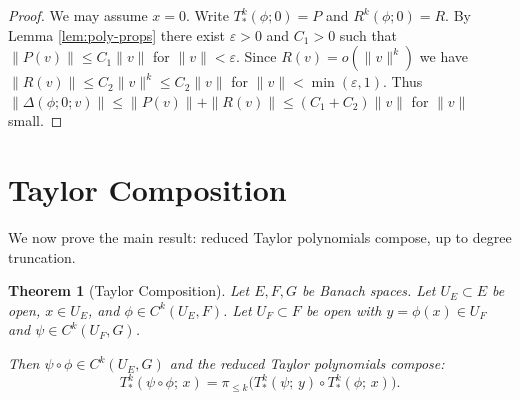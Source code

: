 \documentclass[10pt,a4paper]{article}
\theoremstyle{plain}
\newtheorem{theorem}{Theorem}
\theoremstyle{definition}
\newcommand{\1}{\mathbb{1}} %
\newcommand{\eps}{\varepsilon} %
\begin{document}
\begin{proof}

We may assume \(x = 0\). Write \(T_{\ast}^k(\phi; 0) = P\) and
\(R^k(\phi; 0) = R\). By Lemma \ref{lem:poly-props} there exist
\(\eps > 0\) and \(C_1 > 0\) such that \(\|P(v)\| \leq C_1\|v\|\) for
\(\|v\| < \eps\). Since \(R(v) = o(\|v\|^k)\) we have
\(\|R(v)\| \leq C_2\|v\|^k \leq C_2\|v\|\) for
\(\|v\| < \min(\eps, 1)\). Thus
\(\|\Delta(\phi; 0; v)\| \leq \|P(v)\| + \|R(v)\| \leq (C_1 + C_2)\|v\|\)
for \(\|v\|\) small.

\end{proof}

\section{Taylor Composition}\label{taylor-composition}

We now prove the main result: reduced Taylor polynomials compose, up to
degree truncation.

\begin{theorem}[Taylor Composition]

\label{thm:fdb-comp} Let \(E,F,G\) be Banach spaces. Let
\(U_E \subset E\) be open, \(x \in U_E\), and \(\phi \in C^k(U_E, F)\).
Let \(U_F \subset F\) be open with \(y = \phi(x) \in U_F\) and
\(\psi \in C^k(U_F, G)\).

Then \(\psi \circ \phi \in C^k(U_E, G)\) and the reduced Taylor
polynomials compose: \[
    T_{\ast}^k(\psi \circ \phi;\, x) = \pi_{\leq k}\bigl( T_{\ast}^k(\psi;\, y) \circ T_{\ast}^k(\phi;\, x) \bigr).
    \]

\end{theorem}
\end{document}
